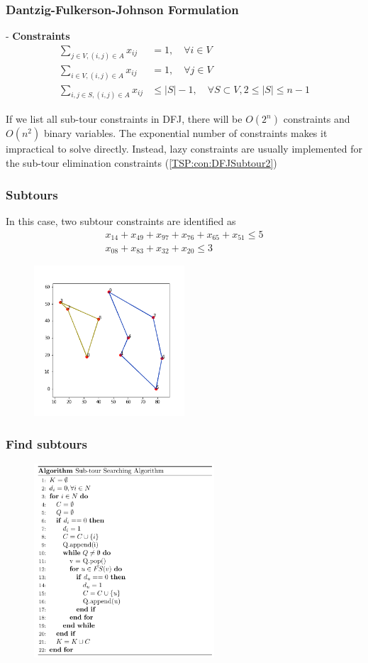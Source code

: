 \documentclass[10pt]{beamer}
\begin{document}
		\begin{frame}
			\frametitle{Dantzig-Fulkerson-Johnson Formulation}
			- \textbf{Constraints}
			\begin{align}
				\sum_{j \in V, (i,j)\in A} x_{ij} & = 1, \quad \forall i \in V \label{TSP:con:degree1}\\
				\sum_{i \in V, (i,j)\in A} x_{ij} & = 1, \quad \forall j \in V \label{TSP:con:degree2}\\
				\sum_{i, j \in S, (i, j) \in A} x_{ij} & \le |S| - 1, \quad \forall S \subset V, 2\le |S| \le n-1\label{TSP:con:DFJSubtour2}
			\end{align}

			If we list all sub-tour constraints in DFJ, there will be $O(2^n)$ constraints and $O(n^2)$ binary variables. The exponential number of constraints makes it impractical to solve directly. Instead, lazy constraints are usually implemented for the sub-tour elimination constraints (\ref{TSP:con:DFJSubtour2})
		\end{frame}

		\begin{frame}
			\frametitle{Subtours}
			In this case, two subtour constraints are identified as 
			\begin{align*}
				x_{14} + x_{49} + x_{97} + x_{76} + x_{65} + x_{51} \le 5\\
				x_{08} + x_{83} + x_{32} + x_{20} \le 3
			\end{align*}

			\begin{figure}[!h]
				\centering
				\includegraphics[width=0.5\textwidth]{SubTour}
			\end{figure}
		\end{frame}

		\begin{frame}
			\frametitle{Find subtours}
			\begin{figure}[!h]
				\centering
				\includegraphics[width=0.6\textwidth]{SubTourAlgo}
			\end{figure}
		\end{frame}
\end{document}
